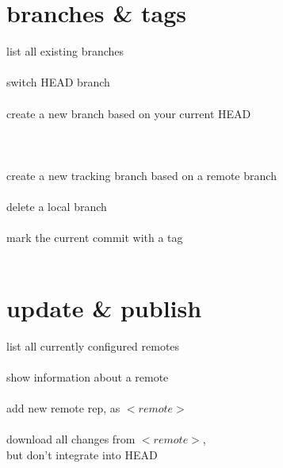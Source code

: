 \documentclass[12pt,landscape]{article}
\begin{document}
\begin{multicols*}{3}
\section{branches \& tags}

list all existing branches \\
 \\

switch HEAD branch \\
 \\

create a new branch based on your current HEAD \\
 \\
 \\
 \\

create a new tracking branch based on a remote branch \\
 \\

delete a local branch \\
 \\

mark the current commit with a tag \\
 \\

\section{update \& publish}

list all currently configured remotes \\
 \\

show information about a remote \\
 \\

add new remote rep, as \(<remote>\) \\
 \\

download all changes from \(<remote>\), \\
\textcolor{solarized_green}{but don't integrate into HEAD} \\
 \\


\end{multicols*}
\end{document}
